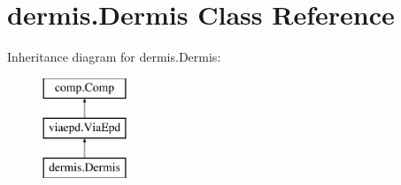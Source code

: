 \hypertarget{classdermis_1_1Dermis}{}\section{dermis.\+Dermis Class Reference}
\label{classdermis_1_1Dermis}
Inheritance diagram for dermis.\+Dermis\+:\begin{figure}[H]
\begin{center}
\leavevmode
\includegraphics[height=3.000000cm]{classdermis_1_1Dermis}
\end{center}
\end{figure}
